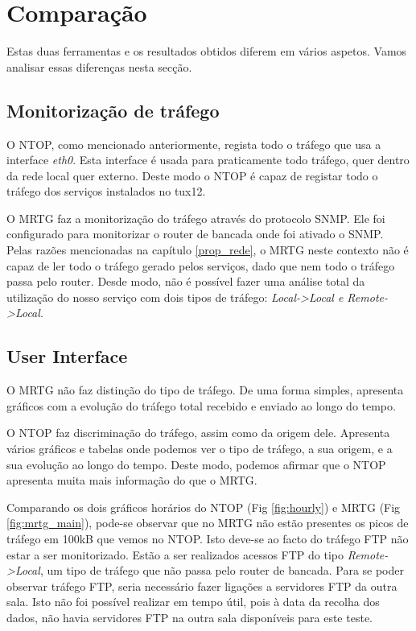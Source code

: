 \section{Comparação}

Estas duas ferramentas e os resultados obtidos diferem em vários aspetos. Vamos analisar essas diferenças nesta secção.

\subsection{Monitorização de tráfego}

O NTOP, como mencionado anteriormente, regista todo o tráfego que usa a interface \textit{eth0}.
Esta interface é usada para praticamente todo tráfego, quer dentro da rede local quer externo.
Deste modo o NTOP é capaz de registar todo o tráfego dos serviços instalados no tux12.

O MRTG faz a monitorização do tráfego através do protocolo SNMP.
Ele foi configurado para monitorizar o router de bancada onde foi ativado o SNMP.
Pelas razões mencionadas na capítulo \ref{prop_rede}, o MRTG neste contexto não é capaz de ler todo o tráfego gerado pelos serviços, dado que nem todo o tráfego passa pelo router.
Desde modo, não é possível fazer uma análise total da utilização do nosso serviço com dois tipos de tráfego: \textit{Local->Local e Remote->Local}.

\subsection{User Interface}

O MRTG não faz distinção do tipo de tráfego.
De uma forma simples, apresenta gráficos com a evolução do tráfego total recebido e enviado ao longo do tempo.

O NTOP faz discriminação do tráfego, assim como da origem dele. Apresenta vários gráficos e tabelas onde podemos ver o tipo de tráfego, a sua origem, e a sua evolução ao longo do tempo.
Deste modo, podemos afirmar que o NTOP apresenta muita mais informação do que o MRTG.

Comparando os dois gráficos horários do NTOP (Fig \ref{fig:hourly}) e MRTG (Fig \ref{fig:mrtg_main}), pode-se observar que no MRTG não estão presentes os picos de tráfego em 100kB que vemos no NTOP.
Isto deve-se ao facto do tráfego FTP não estar a ser monitorizado. Estão a ser realizados acessos FTP do tipo \textit{Remote->Local}, um tipo de tráfego que não passa pelo router de bancada.
Para se poder observar tráfego FTP, seria necessário fazer ligações a servidores FTP da outra sala.
Isto não foi possível realizar em tempo útil, pois à data da recolha dos dados, não havia servidores FTP na outra sala disponíveis para este teste.

